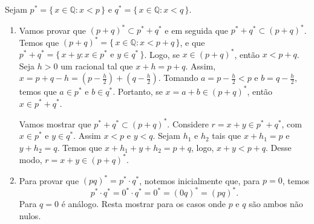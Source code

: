 \documentclass[../main.tex]{subfiles}
\begin{document}
\begin{dem}
    Sejam $p^* = \{\,x \in \mathbb{Q} : x < p\,\}$ e $q^* = \{\,x \in \mathbb{Q} : x < q\,\}$.
    \begin{enumerate}[label=(\roman*)]
     \item Vamos provar que $(p+q)^* \subset p^* + q^*$ e em seguida que $p^*+q^*  \subset (p+q)^*$.\\
     Temos que $(p+q)^* = \{\, x \in \mathbb{Q} : x < p+q \,\}$, e que $p^* + q^* = \{\,x+y : x \in p^* \text{ e } y \in q^*\,\}$. Logo, se $x \in (p+q)^*$, então $x<p+q$. Seja $h>0$ um racional tal que $x+h = p+q$. Assim, $x = p+q-h = \left( p-\frac{h}{2}\right) + \left(q-\frac{h}{2} \right) $. Tomando $a = p - \frac{h}{2} < p$ e $b = q - \frac{h}{2}$, temos que $a \in p^*$ e $b \in q^*$. 
     Portanto, se $x = a+b \in (p+q)^*$, então $x \in p^* + q^*$.

     Vamos mostrar que $p^* + q^* \subset (p+q)^*$. Considere $r = x+y \in p^*+q^*$, com $x \in p^*$ e $y \in q^*$. Assim $x < p$ e $y < q$. Sejam $h_1$ e $h_2$ tais que $x+h_1 = p$ e $y+h_2 = q$. Temos que $x+h_1 + y + h_2 = p+q$, logo, $x+y < p+q$. Desse modo, $r = x+y \in (p+q)^*$. 


    \item Para provar que $(pq)^* = p^*\cdot q^*$, notemos inicialmente que, para $p=0$, temos
        \[ p^* \cdot q^* = 0^* \cdot q^* = 0^* = (0q)^* = (pq)^*. \]
        Para $q = 0$ é análogo. Resta mostrar para os casos onde $p$ e $q$ são ambos não nulos. 


\end{enumerate}
\end{dem}
\end{document}
